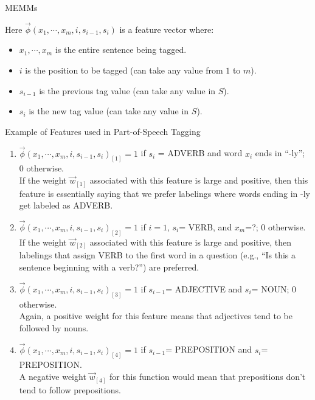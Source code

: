 \documentclass[handout]{beamer}
\begin{document}
\begin{frame}{MEMMs}
\begin{scriptsize}

Here $\vec{\phi}(x_1, \cdots, x_m, i, s_{i-1},s_i)$ is a feature vector where:
\begin{itemize}
 \item $x_1, \cdots, x_m$ is the entire sentence being tagged.
  \item $i$ is the position to be tagged (can take any value from $1$ to $m$).
  \item $s_{i-1}$ is the previous tag value (can take any value in $S$).
  \item $s_i$ is the new tag value (can take any value in $S$).
 
\end{itemize}


\end{scriptsize}
\end{frame}

\begin{frame}{Example of Features used in Part-of-Speech Tagging}
\begin{scriptsize}


\begin{enumerate}
 \item $\vec{\phi}(x_1, \cdots, x_m, i, s_{i-1},s_i)_{[1]}=1$ if $s_i$ = ADVERB and word $x_i$ ends in ``-ly''; 0 otherwise. \\ 
 
 If the weight $\vec{w}_{[1]}$ associated with this feature is large and positive, then this feature is essentially saying that we prefer labelings where words ending in -ly get labeled as ADVERB.
 
 \item $\vec{\phi}(x_1, \cdots, x_m, i, s_{i-1},s_i)_{[2]}=1$ if $i=1$, $s_i$= VERB, and $x_m$=?; 0 otherwise. 
 \\ If the weight $\vec{w}_{[2]}$ associated with this feature is large and positive, then labelings that assign VERB to the first word in a question (e.g., ``Is this a sentence beginning with a verb?'') are preferred.


\item $\vec{\phi}(x_1, \cdots, x_m, i, s_{i-1},s_i)_{[3]}=1$ if $s_{i-1}$= ADJECTIVE and $s_i$= NOUN; 0 otherwise. 
\\Again, a positive weight for this feature means that adjectives tend to be followed by nouns. 

\item $\vec{\phi}(x_1, \cdots, x_m, i, s_{i-1},s_i)_{[4]}=1$ if $s_{i-1}$= PREPOSITION and $s_{i}$= PREPOSITION. 
\\ A negative weight $\vec{w}_{[4]}$ for this function would mean that prepositions don't tend to follow prepositions.

 
\end{enumerate}



\end{scriptsize}
\end{frame}
\end{document}
